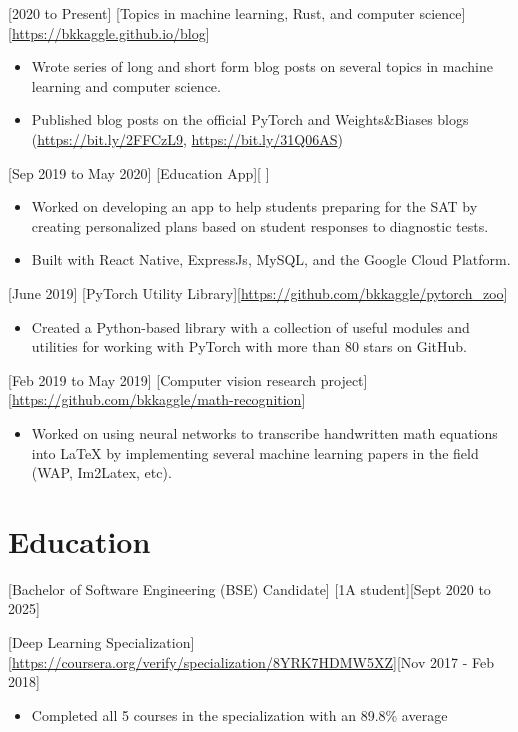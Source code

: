 \documentclass{article}
\begin{document}
[2020 to Present]
[Topics in machine learning, Rust, and computer science][\url{https://bkkaggle.github.io/blog}]

\begin{itemize}
    \item Wrote series of long and short form blog posts on several topics in machine learning and computer science.
    \item Published blog posts on the official PyTorch and Weights\&Biases blogs (\url{https://bit.ly/2FFCzL9}, \url{https://bit.ly/31Q06AS})
\end{itemize}

[Sep 2019 to May 2020]
[Education App][ ]
\begin{itemize}
    \item Worked on developing an app to help students preparing for the SAT by creating personalized plans based on student responses to diagnostic tests.
    \item Built with React Native, ExpressJs, MySQL, and the Google Cloud Platform.
\end{itemize}

[June 2019]
[PyTorch Utility Library][\url{https://github.com/bkkaggle/pytorch\_zoo}]

\begin{itemize}
    \item Created a Python-based library with a collection of useful modules and utilities for working with PyTorch with more than 80 stars on GitHub.
\end{itemize}

[Feb 2019 to May 2019]
[Computer vision research project][\url{https://github.com/bkkaggle/math-recognition}]

\begin{itemize}
\item Worked on using neural networks to transcribe handwritten math equations into LaTeX by implementing several machine learning papers in the field (WAP, Im2Latex, etc).
\end{itemize}

\section{Education}

[Bachelor of Software Engineering (BSE) Candidate]
[1A student][Sept 2020 to 2025]
 
[Deep Learning Specialization]
[\url{https://coursera.org/verify/specialization/8YRK7HDMW5XZ}][Nov 2017 - Feb 2018]

\begin{itemize}
\item Completed all 5 courses in the specialization with an 89.8\% average
\end{itemize}
\end{document}
